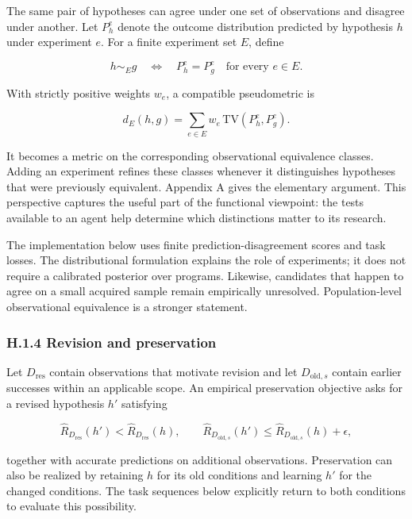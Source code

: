 \documentclass[11pt,a4paper]{article}
\begin{document}
The same pair of hypotheses can agree under one set of observations and disagree under another. Let \(P_h^e\) denote the outcome distribution predicted by hypothesis \(h\) under experiment \(e\). For a finite experiment set \(E\), define


\[
h\sim_E g
\quad\Longleftrightarrow\quad
P_h^e=P_g^e\quad\text{for every }e\in E.
\]


With strictly positive weights \(w_e\), a compatible pseudometric is


\[
d_E(h,g)=\sum_{e\in E}w_e\,\mathrm{TV}(P_h^e,P_g^e).
\]


It becomes a metric on the corresponding observational equivalence classes. Adding an experiment refines these classes whenever it distinguishes hypotheses that were previously equivalent. Appendix A gives the elementary argument. This perspective captures the useful part of the functional viewpoint: the tests available to an agent help determine which distinctions matter to its research.


The implementation below uses finite prediction-disagreement scores and task losses. The distributional formulation explains the role of experiments; it does not require a calibrated posterior over programs. Likewise, candidates that happen to agree on a small acquired sample remain empirically unresolved. Population-level observational equivalence is a stronger statement.


\subsubsection*{H.1.4 Revision and preservation}

Let \(D_{\mathrm{res}}\) contain observations that motivate revision and let \(D_{\mathrm{old},s}\) contain earlier successes within an applicable scope. An empirical preservation objective asks for a revised hypothesis \(h'\) satisfying


\[
\widehat R_{D_{\mathrm{res}}}(h')
<\widehat R_{D_{\mathrm{res}}}(h),
\qquad
\widehat R_{D_{\mathrm{old},s}}(h')
\leq\widehat R_{D_{\mathrm{old},s}}(h)+\epsilon,
\]


together with accurate predictions on additional observations. Preservation can also be realized by retaining \(h\) for its old conditions and learning \(h'\) for the changed conditions. The task sequences below explicitly return to both conditions to evaluate this possibility.
\end{document}
